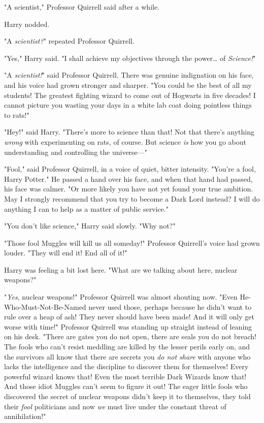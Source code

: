 "A scientist," Professor Quirrell said after a while.

Harry nodded.

"A \emph{scientist?}" repeated Professor Quirrell.

"Yes," Harry said. "I shall achieve my objectives through the power{\ldots} of \emph{Science!}"

"A \emph{scientist!}" said Professor Quirrell. There was genuine indignation on his face, and his voice had grown stronger and sharper. "You could be the best of all my students! The greatest fighting wizard to come out of Hogwarts in five decades! I cannot picture you wasting your days in a white lab coat doing pointless things to rats!"

"Hey!" said Harry. "There's more to science than that! Not that there's anything \emph{wrong} with experimenting on rats, of course. But science \emph{is} how you go about understanding and controlling the universe---"

"Fool," said Professor Quirrell, in a voice of quiet, bitter intensity. "You're a fool, Harry Potter." He passed a hand over his face, and when that hand had passed, his face was calmer. "Or more likely you have not yet found your true ambition. May I strongly recommend that you try to become a Dark Lord instead? I will do anything I can to help as a matter of public service."

"You don't like science," Harry said slowly. "Why not?"

"Those fool Muggles will kill us all someday!" Professor Quirrell's voice had grown louder. "They will end it! End all of it!"

Harry was feeling a bit lost here. "What are we talking about here, nuclear weapons?"

"\emph{Yes}, nuclear weapons!" Professor Quirrell was almost shouting now. "Even He-Who-Must-Not-Be-Named never used those, perhaps because he didn't want to rule over a heap of ash! They never should have been made! And it will only get worse with time!" Professor Quirrell was standing up straight instead of leaning on his desk. "There are gates you do not open, there are seals you do not breach! The fools who can't resist meddling are killed by the lesser perils early on, and the survivors all know that there are secrets you \emph{do not share} with anyone who lacks the intelligence and the discipline to discover them for themselves! Every powerful wizard knows that! Even the most terrible Dark Wizards know that! And those idiot Muggles can't seem to figure it out! The eager little fools who discovered the secret of nuclear weapons didn't keep it to themselves, they told their \emph{fool} politicians and now \emph{we} must live under the constant threat of annihilation!"

